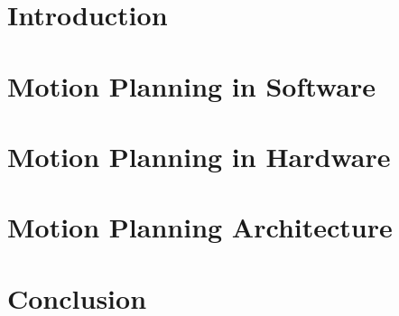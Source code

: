 \documentclass[
    11pt,           %
    a4paper,    %
    draft,          %
    oneside         %
]{report}           %
\begin{document}
\chapter{Introduction}
    


\chapter{Motion Planning in Software}
    \label{chap:MotionPlanningInSoftware}
    

\chapter{Motion Planning in Hardware}
    \label{chap:MotionPlanningInHardware}
    

\chapter{Motion Planning Architecture}
    \label{chap:MotionPlaningArchitecture}
    

\chapter{Conclusion}
    
\end{document}

